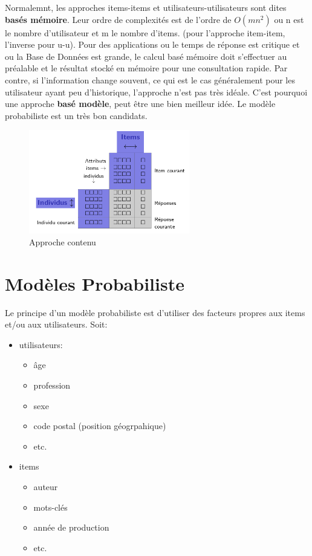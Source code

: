 \documentclass[oneside]{book}
\begin{document}
Normalemnt, les approches items-items et utilisateurs-utilisateurs sont dites \textbf{basés mémoire}. Leur ordre de complexités est de l'ordre de $O(mn^2)$ ou n est le nombre d'utilisateur et m le nombre d'items. (pour l'approche item-item, l'inverse pour u-u). Pour des applications ou le temps de réponse est critique et ou la Base de Données est grande, le calcul basé mémoire doit s'effectuer au préalable et le résultat stocké en mémoire pour une consultation rapide. Par contre, si l'information change souvent, ce qui est le cas généralement pour les utilisateur ayant peu d'historique, l'approche n'est pas très idéale. C'est pourquoi une approche \textbf{basé modèle}, peut être une bien meilleur idée. Le modèle probabiliste est un très bon candidats.

\begin{figure}[!ht]
\centering
\includegraphics[width = 7cm]{contenu.png}
\caption{Approche contenu}
\label{fig:contenu}
\end{figure}

\section{Modèles Probabiliste}
Le principe d'un modèle probabiliste est d'utiliser des facteurs propres aux items et/ou aux utilisateurs. Soit:
\begin{itemize}
\item utilisateurs:
\begin{itemize}
\item âge
\item profession
\item sexe
\item code postal (position géogrpahique)
\item etc.
\end{itemize}
\item items
\begin{itemize}
\item auteur
\item mots-clés
\item année de production
\item etc.
\end{itemize}
\end{itemize}
\end{document}
